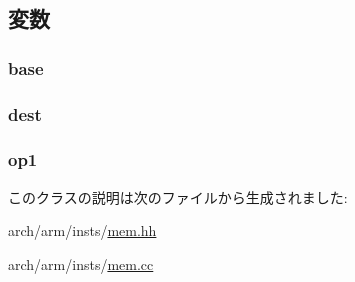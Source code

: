 \subsection{変数}
\hypertarget{classArmISA_1_1Swap_ad7a926fdfe0820284d654e9139a423b2}{
\subsubsection[{base}]{ {\bf base}}}
\label{classArmISA_1_1Swap_ad7a926fdfe0820284d654e9139a423b2}
\hypertarget{classArmISA_1_1Swap_aec72e8e45bdc87abeeeb75d2a8a9a716}{
\subsubsection[{dest}]{ {\bf dest}}}
\label{classArmISA_1_1Swap_aec72e8e45bdc87abeeeb75d2a8a9a716}
\hypertarget{classArmISA_1_1Swap_a4c465c43ad568f8bcf8ae71480e9cfea}{
\subsubsection[{op1}]{ {\bf op1}}}
\label{classArmISA_1_1Swap_a4c465c43ad568f8bcf8ae71480e9cfea}


このクラスの説明は次のファイルから生成されました:\begin{DoxyCompactItemize}
\item 
arch/arm/insts/\hyperlink{arm_2insts_2mem_8hh}{mem.hh}\item 
arch/arm/insts/\hyperlink{arm_2insts_2mem_8cc}{mem.cc}\end{DoxyCompactItemize}
